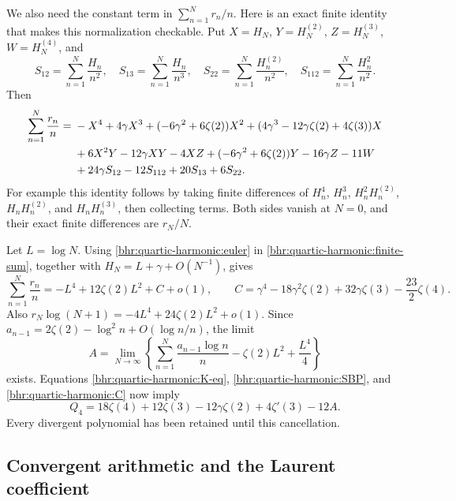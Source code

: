 We also need the constant term in $\sum_{n=1}^N r_n/n$.
Here is an exact finite identity that makes this normalization
checkable. Put $X=H_N$, $Y=H_N^{(2)}$, $Z=H_N^{(3)}$,
$W=H_N^{(4)}$, and
\[
 S_{12}=\sum_{n=1}^N\frac{H_n}{n^2},\quad
 S_{13}=\sum_{n=1}^N\frac{H_n}{n^3},\quad
 S_{22}=\sum_{n=1}^N\frac{H_n^{(2)}}{n^2},\quad
 S_{112}=\sum_{n=1}^N\frac{H_n^2}{n^2}.
\]
Then
\begin{align}
 \sum_{n=1}^N\frac{r_n}{n}
 ={}&-X^4+4\gamma X^3+(-6\gamma^2+6\zeta(2))X^2
       +(4\gamma^3-12\gamma\zeta(2)+4\zeta(3))X\notag\\
 &+6X^2Y-12\gamma XY-4XZ
       +(-6\gamma^2+6\zeta(2))Y-16\gamma Z-11W\notag\\
 &+24\gamma S_{12}-12S_{112}+20S_{13}+6S_{22}.
 \label{bhr:quartic-harmonic:finite-sum}
\end{align}
For example this identity follows by taking finite differences of
$H_n^4$, $H_n^3$, $H_n^2H_n^{(2)}$, $H_nH_n^{(2)}$,
and $H_nH_n^{(3)}$, then collecting terms. Both sides vanish at
$N=0$, and their exact finite differences are $r_N/N$.

Let $L=\log N$. Using \eqref{bhr:quartic-harmonic:euler} in
\eqref{bhr:quartic-harmonic:finite-sum}, together with
$H_N=L+\gamma+O(N^{-1})$, gives
\begin{equation}
 \sum_{n=1}^N\frac{r_n}{n}
 =-L^4+12\zeta(2)L^2+C+o(1),\qquad
 C=\gamma^4-18\gamma^2\zeta(2)+32\gamma\zeta(3)
       -\frac{23}2\zeta(4).
 \label{bhr:quartic-harmonic:C}
\end{equation}
Also
$r_N\log(N+1)=-4L^4+24\zeta(2)L^2+o(1)$.
Since $a_{n-1}=2\zeta(2)-\log^2n+O(\log n/n)$, the limit
\begin{equation}
 A=\lim_{N\to\infty}\left\{
  \sum_{n=1}^N\frac{a_{n-1}\log n}{n}
      -\zeta(2)L^2+\frac{L^4}{4}\right\}
 \label{bhr:quartic-harmonic:A}
\end{equation}
exists. Equations \eqref{bhr:quartic-harmonic:K-eq},
\eqref{bhr:quartic-harmonic:SBP}, and \eqref{bhr:quartic-harmonic:C}
now imply
\begin{equation}
 Q_4=18\zeta(4)+12\zeta(3)-12\gamma\zeta(2)
                         +4\zeta'(3)-12A.
 \label{bhr:quartic-harmonic:before-Laurent}
\end{equation}
Every divergent polynomial has been retained until this cancellation.

\subsection{Convergent arithmetic and the Laurent coefficient}

